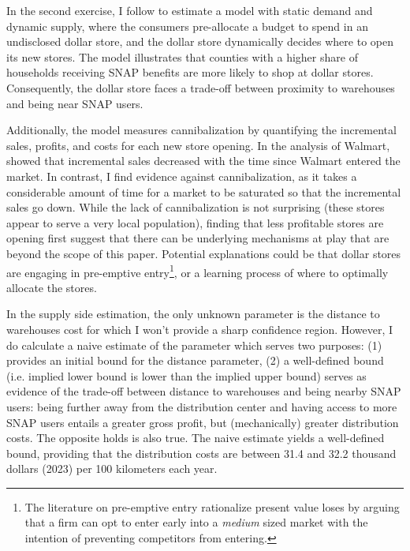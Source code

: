 \documentclass[11.5pt]{article}
\begin{document}
In the second exercise, I follow \citeauthor{holmes2011diffusion} \citeyear{holmes2011diffusion} to estimate a model with static demand and dynamic supply, where the consumers pre-allocate a budget to spend in an undisclosed dollar store, and the dollar store dynamically decides where to open its new stores. The model illustrates that counties with a higher share of households receiving SNAP benefits are more likely to shop at dollar stores. Consequently, the dollar store faces a trade-off between proximity to warehouses and being near SNAP users.

Additionally, the model measures cannibalization by quantifying the incremental sales, profits, and costs for each new store opening. In the analysis of Walmart, \citeauthor{holmes2011diffusion} showed that incremental sales decreased with the time since Walmart entered the market. In contrast, I find evidence against cannibalization, as it takes a considerable amount of time for a market to be saturated so that the incremental sales go down. While the lack of cannibalization is not surprising (these stores appear to serve a very local population), finding that less profitable stores are opening first suggest that there can be  underlying mechanisms at play that are beyond the scope of this paper. Potential explanations could be that dollar stores are engaging in pre-emptive entry\footnote{The literature on pre-emptive entry \cite{ellison2011strategic,gil2021preemptive} rationalize present value loses by arguing that a firm can opt to enter early into a \textit{medium} sized market with the intention of preventing competitors from entering.}, or a learning process of where to optimally allocate the stores. 


In the supply side estimation, the only unknown parameter is the distance to warehouses cost for which I won't provide a sharp confidence region. However, I do calculate a naive estimate of the parameter which serves two purposes: (1) provides an initial bound for the distance parameter, (2) a well-defined bound (i.e. implied lower bound is lower than the implied upper bound) serves as evidence of the trade-off between distance to warehouses and being nearby SNAP users: being further away from the distribution center and having access to more SNAP users entails a greater gross profit, but (mechanically) greater distribution costs. The opposite holds is also true. The naive estimate yields a well-defined bound, providing that the distribution costs are between 31.4 and 32.2 thousand dollars (2023) per 100 kilometers each year. 
\end{document}
